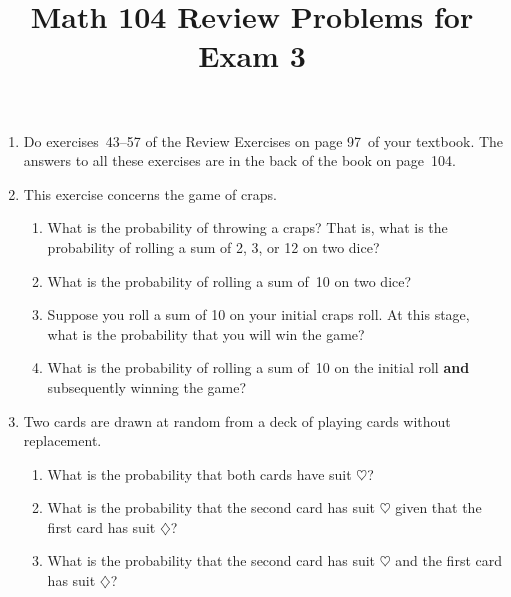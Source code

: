 \documentclass[12pt]{article}
\author{}\date{}
\title{Math 104 Review Problems for Exam 3}\author{}
\begin{document}
\maketitle
\pagestyle{empty}
\begin{enumerate}
\item Do exercises~43--57 of the Review Exercises
on page 97~of your textbook.
The answers to all these exercises are in the
back of the book on page~104.

\item This exercise concerns the game of craps.
\begin{enumerate}
\item What is the probability of throwing a craps? That is, what is
the probability of rolling a sum of 2, 3, or 12 on two dice?
\item What is the probability of rolling a sum of~10 on two dice?
\item Suppose you roll a sum of 10 on your initial craps roll.
At this stage, what is the probability that you will win the game?
\item What is the probability of rolling a sum of~10 on the initial
roll {\bf and} subsequently winning the game?
\end{enumerate}

\item
Two cards are drawn at random from a deck of playing cards
without replacement.
\begin{enumerate}
\item What is the probability that both cards have suit
$\heartsuit$?
\item What is the probability that the second card has
suit $\heartsuit$
given that the first card has suit $\diamondsuit$?
\item What is the probability that the second card has
suit $\heartsuit$
and the first card has suit $\diamondsuit$?
\end{enumerate}


\end{enumerate}
\end{document}

